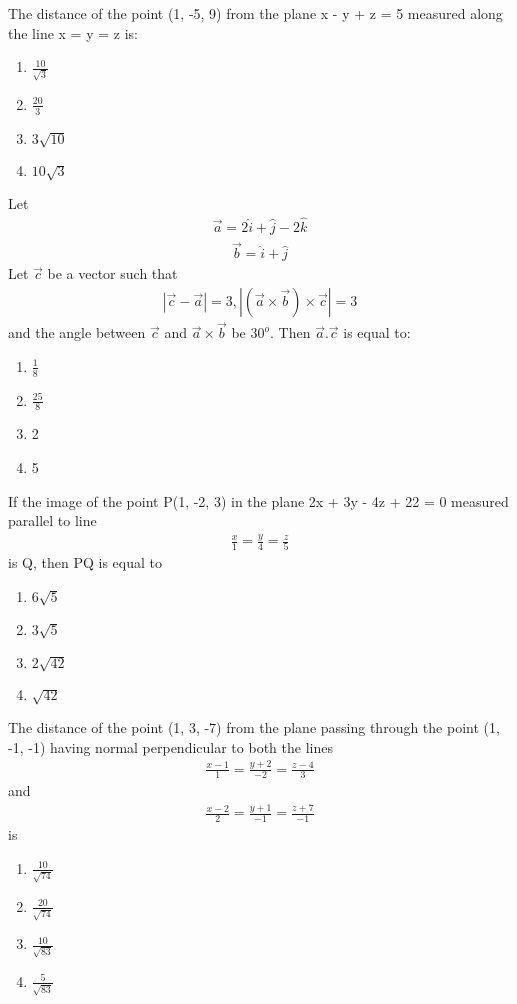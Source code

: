 \item The distance of the point (1, -5, 9) from the plane x - y + z = 5 measured along the line x = y = z is:
\begin{enumerate}
\item $\frac{10}{\sqrt{3}}$
\item $\frac{20}{3}$
\item $3\sqrt{10}$
\item $10\sqrt{3}$
\end{enumerate}

\item Let 
\begin{align*}
\overrightarrow{a} = 2\hat{i} + \hat{j} - 2\hat{k}
\end{align*}
\begin{align*}
\overrightarrow{b} = \hat{i} + \hat{j}
\end{align*} 
Let $\overrightarrow{c}$ be a vector such that
\begin{align*}
|\overrightarrow{c} - \overrightarrow{a}| = 3, |(\overrightarrow{a} \times \overrightarrow{b}) \times \overrightarrow{c}|=3
\end{align*}
and the angle between $\overrightarrow{c}$ and $\overrightarrow{a} \times \overrightarrow{b}$ be $30^{o}$. Then $\overrightarrow{a}.\overrightarrow{c}$ is equal to:
\begin{enumerate}
\item $\frac{1}{8}$
\item $\frac{25}{8}$
\item 2
\item 5
\end{enumerate}

\item If the image of the point P(1, -2, 3) in the plane 2x + 3y - 4z + 22 = 0 measured parallel to line 
\begin{align*}
\frac{x}{1} = \frac{y}{4} = \frac{z}{5}
\end{align*}
is Q, then PQ is equal to
\begin{enumerate}
\item $6\sqrt{5}$
\item $3\sqrt{5}$
\item $2\sqrt{42}$
\item $\sqrt{42}$
\end{enumerate}

\item The distance of the point (1, 3, -7) from the plane passing through the point (1, -1, -1) having normal perpendicular to both the lines
\begin{align*}
\frac{x-1}{1} = \frac{y+2}{-2} = \frac{z-4}{3}
\end{align*}
and
\begin{align*}
\frac{x-2}{2} = \frac{y+1}{-1} = \frac{z+7}{-1}
\end{align*}
is
\begin{enumerate}
\item $\frac{10}{\sqrt{74}}$
\item $\frac{20}{\sqrt{74}}$
\item $\frac{10}{\sqrt{83}}$
\item $\frac{5}{\sqrt{83}}$
\end{enumerate}

